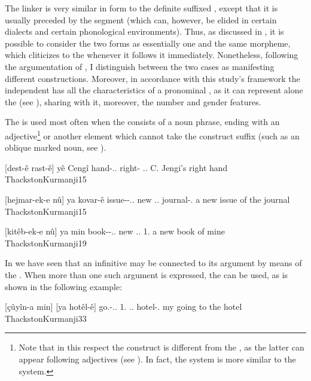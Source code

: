 The linker \ez* is very similar in form to the definite suffixed \ez*, except that it is usually preceded by the segment  (which can, however, be elided in certain dialects and certain phonological environments). Thus, as discussed in , it is possible to consider  the two forms as essentially one and the same morpheme, which cliticizes to the \prim whenever it follows it immediately. Nonetheless, following the argumentation of \citet{SamvelianHead}, I distinguish between the two cases as manifesting different constructions. Moreover, in accordance with this study's framework the independent \ez* has all the characteristics of a pronominal \lnk*, as it can represent alone the \prim (see ), sharing with it, moreover, the number and gender features.

The \lnk* \ez* is used most often when the \prim consists of a noun phrase, ending with an adjective\footnote{Note that in this respect the \Kur construct \ez* is different from the \Per \ez*, as the latter can appear following adjectives (see ). In fact, the \Per system is more similar to the \Sor system.} or another element which cannot take the construct \ez* suffix (such as an oblique marked noun, see ).

{[dest-ê rast-ê] yê  Cengî}
{hand-\ez..\masc{} right-\adj\footnotemark{} \lnk.\ez.\masc{} C.}
{Jengi's right hand}
{ThackstonKurmanji}{15}


{[hejmar-ek-e nû] ya kovar-ê}
{issue-\indef-\ez.\indef.\fem{} new \lnk.\ez.\fem{} journal-\obl.\masc}
{a new issue of the journal}
{ThackstonKurmanji}{15}

{[kitêb-ek-e nû] ya min}
{book-\indef-\ez.\indef.\fem{} new \lnk.\ez.\fem{} 1\sg.\obl}
{a new book of mine}
{ThackstonKurmanji}{19}

In  we have seen that an infinitive may be connected to its argument by means of the \ez*. When more than one such argument is expressed, the \lnk* \ez* can be used, as is shown in the following example:

{[çûyîn-a min] [ya hotêl-ê]}
{go.\inf-\ez..\fem{} 1\sg.\obl{} \lnk.\ez.\fem{} hotel-\obl.\fem}
{my going to the hotel}
{ThackstonKurmanji}{33}

